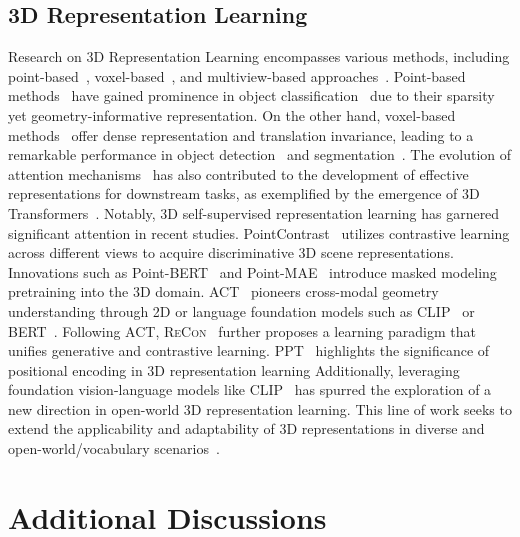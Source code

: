 \subsection{3D Representation Learning}
Research on 3D Representation Learning encompasses various methods, including point-based~\cite{PointNet,PointNet++}, voxel-based~\cite{voxelnet15}, and multiview-based approaches~\cite{MVCNN3D15,MVTN}. 
Point-based methods~\cite{PointNext,PointTrans21} have gained prominence in object classification~\cite{ModelNet15,ScanObjectNN19} due to their sparsity yet geometry-informative representation. On the other hand, voxel-based methods~\cite{voxelrcnn21,SyncSpecCNN17,VPP23} offer dense representation and translation invariance, leading to a remarkable performance in object detection~\cite{ScanNet17} and segmentation~\cite{ShapeNetPart16, S3DIS16}.
The evolution of attention mechanisms~\cite{AttentionIsAllYouNeed,ReKo23} has also contributed to the development of effective representations for downstream tasks, as exemplified by the emergence of 3D Transformers~\cite{PointTrans21,groupfree21, voxeltransformer21}. Notably, 3D self-supervised representation learning has garnered significant attention in recent studies. PointContrast~\cite{PointContrast20} utilizes contrastive learning across different views to acquire discriminative 3D scene representations. Innovations such as Point-BERT~\cite{PointBERT} and Point-MAE~\cite{PointMAE} introduce masked modeling~\cite{MAE,BERT} pretraining into the 3D domain. 
ACT~\cite{ACT23} pioneers cross-modal geometry understanding through 2D or language foundation models such as CLIP~\cite{CLIP} or BERT~\cite{BERT}. 
Following ACT, {\scshape ReCon}~\cite{ReCon23} further proposes a learning paradigm that unifies generative and contrastive learning. PPT~\cite{ppt24} highlights the significance of positional encoding in 3D representation learning
Additionally, leveraging foundation vision-language models like CLIP~\cite{ACT23,CLIP} has spurred the exploration of a new direction in open-world 3D representation learning. This line of work seeks to extend the applicability and adaptability of 3D representations in diverse and open-world/vocabulary scenarios~\cite{OpenScene23,CLIPFO3D23,PLA23,Lowis3D23,OVIR3D23,PointGCC23}.

\section{Additional Discussions}
